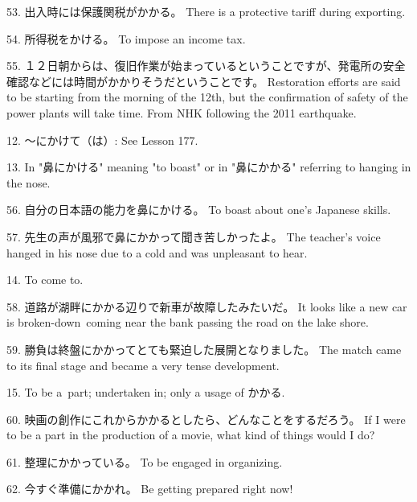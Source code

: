 \par{53. 出入時には保護関税がかかる。 \hfill\break
There is a protective tariff during exporting. }

\par{54. 所得税をかける。 \hfill\break
To impose an income tax. }

\par{55. １２日朝からは、復旧作業が始まっているということですが、発電所の安全確認などには時間がかかりそうだということです。 \hfill\break
Restoration efforts are said to be starting from the morning of the 12th, but the confirmation of safety of the power plants will take time. \hfill\break
From NHK following the 2011 earthquake. }

\par{12. ～にかけて（は）: See Lesson 177. }

\par{13. In "鼻にかける" meaning "to boast" or in "鼻にかかる" referring to hanging in the nose. }

\par{56. 自分の日本語の能力を鼻にかける。 \hfill\break
To boast about one's Japanese skills. }

\par{57. 先生の声が風邪で鼻にかかって聞き苦しかったよ。 \hfill\break
The teacher's voice hanged in his nose due to a cold and was unpleasant to hear. }

\par{14. To come to. }

\par{58. 道路が湖畔にかかる辺りで新車が故障したみたいだ。 \hfill\break
It looks like a new car is broken-down coming near the bank passing the road on the lake shore. }

\par{59. 勝負は終盤にかかってとても緊迫した展開となりました。 \hfill\break
The match came to its final stage and became a very tense development. }

\par{15. To be a part; undertaken in; only a usage of かかる. }

\par{60. 映画の創作にこれからかかるとしたら、どんなことをするだろう。 \hfill\break
If I were to be a part in the production of a movie, what kind of things would I do? }

\par{61. 整理にかかっている。 \hfill\break
To be engaged in organizing. }

\par{62. 今すぐ準備にかかれ。 \hfill\break
Be getting prepared right now! }

